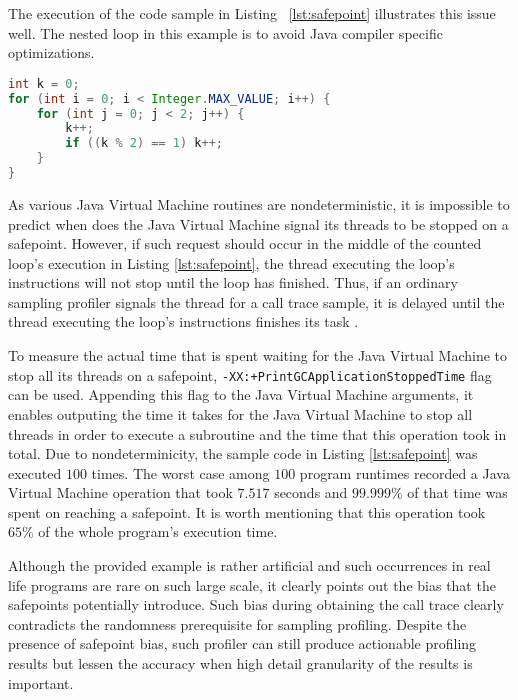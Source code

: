 \documentclass[..thesis.tex]{subfiles}
\begin{document}
The execution of the code sample in Listing ~\ref{lst:safepoint} illustrates this issue well. The nested loop in this example is to avoid Java compiler specific optimizations.

\begin{lstlisting}[language=java,style=def,label={lst:safepoint}, caption={Counted loops do not contain safepoints}]
int k = 0;
for (int i = 0; i < Integer.MAX_VALUE; i++) {
	for (int j = 0; j < 2; j++) {
    	k++;
    	if ((k % 2) == 1) k++;
	}
}
\end{lstlisting}
As various Java Virtual Machine routines are nondeterministic, it is impossible to predict when does the Java Virtual Machine signal its threads to be stopped on a safepoint. However, if such request should occur in the middle of the counted loop's execution in Listing \ref{lst:safepoint}, the thread executing the loop's instructions will not stop until the loop has finished. Thus, if an ordinary sampling profiler signals the thread for a call trace sample, it is delayed until the thread executing the loop's instructions finishes its task \cite{wakart_psychosomatic_2015}. 

To measure the actual time that is spent waiting for the Java Virtual Machine to stop all its threads on a safepoint, \texttt{-XX:+PrintGCApplicationStoppedTime} flag can be used. Appending this flag to the Java Virtual Machine arguments, it enables outputing the time it takes for the Java Virtual Machine to stop all threads in order to execute a subroutine and the time that this operation took in total. Due to nondeterminicity, the sample code in Listing \ref{lst:safepoint} was executed $100$ times. The worst case among $100$ program runtimes recorded a Java Virtual Machine operation that took $7.517$ seconds and $99.999\%$ of that time was spent on reaching a safepoint. It is worth mentioning that this operation took $65\%$ of the whole program's execution time.

Although the provided example is rather artificial and such occurrences in real life programs are rare on such large scale, it clearly points out the bias that the safepoints potentially introduce. Such bias during obtaining the call trace clearly contradicts the randomness prerequisite for sampling profiling. Despite the presence of safepoint bias, such profiler can still produce actionable profiling results but lessen the accuracy when high detail granularity of the results is important.
\end{document}
